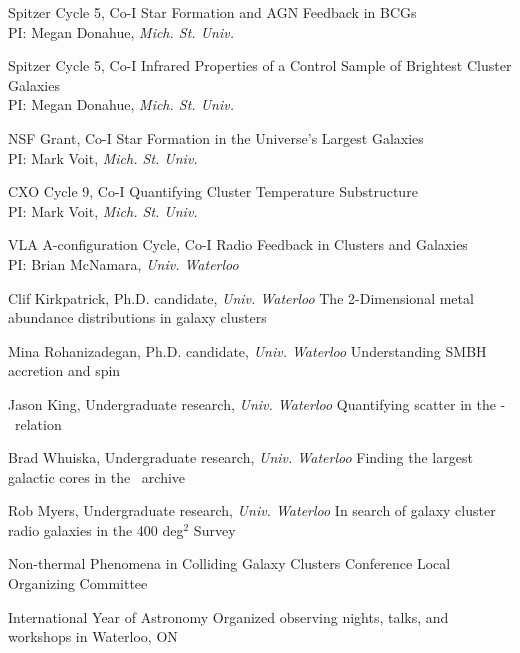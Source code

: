\documentclass[12pt]{cv}
\begin{document}
\begin{llist}
Spitzer Cycle 5, Co-I
Star Formation and AGN Feedback in BCGs\\%
PI: Megan Donahue, {\textit{Mich. St. Univ.}}

Spitzer Cycle 5, Co-I
Infrared Properties of a Control Sample of Brightest Cluster Galaxies\\%
PI: Megan Donahue, {\textit{Mich. St. Univ.}}

NSF Grant, Co-I
Star Formation in the Universe's Largest Galaxies\\%
PI: Mark Voit, {\textit{Mich. St. Univ.}}

CXO Cycle 9, Co-I
Quantifying Cluster Temperature Substructure\\%
PI: Mark Voit, {\textit{Mich. St. Univ.}}

VLA A-configuration Cycle, Co-I
Radio Feedback in Clusters and Galaxies\\%
PI: Brian McNamara, {\textit{Univ. Waterloo}}


Clif Kirkpatrick, Ph.D. candidate, {\textit{Univ. Waterloo}}
The 2-Dimensional metal abundance distributions in galaxy clusters

Mina Rohanizadegan, Ph.D. candidate, {\textit{Univ. Waterloo}}
Understanding SMBH accretion and spin

Jason King, Undergraduate research, {\textit{Univ. Waterloo}}
Quantifying scatter in the \pjet-\prad\ relation

Brad Whuiska, Undergraduate research, {\textit{Univ. Waterloo}}
Finding the largest galactic cores in the \hst\ archive

Rob Myers, Undergraduate research, {\textit{Univ. Waterloo}}
In search of galaxy cluster radio galaxies in the 400 deg$^2$ Survey


Non-thermal Phenomena in Colliding Galaxy Clusters
Conference Local Organizing Committee

International Year of Astronomy
Organized observing nights, talks, and workshops in Waterloo, ON



\end{llist}
\end{document}
